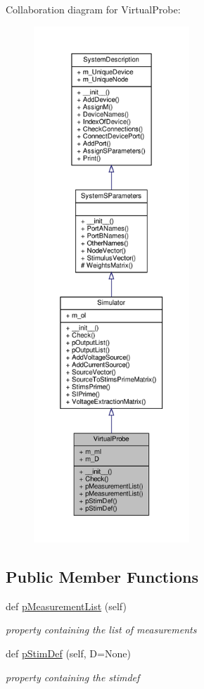 Collaboration diagram for Virtual\+Probe\+:\nopagebreak
\begin{figure}[H]
\begin{center}
\leavevmode
\includegraphics[height=550pt]{classSignalIntegrity_1_1SystemDescriptions_1_1VirtualProbe_1_1VirtualProbe__coll__graph}
\end{center}
\end{figure}
\subsection*{Public Member Functions}
\begin{DoxyCompactItemize}
\item 
def \hyperlink{classSignalIntegrity_1_1SystemDescriptions_1_1VirtualProbe_1_1VirtualProbe_af72b7ac7a9d1aa3b37f74ab894c2050d}{p\+Measurement\+List} (self)
\begin{DoxyCompactList}\small\item\em property containing the list of measurements \end{DoxyCompactList}\item 
def \hyperlink{classSignalIntegrity_1_1SystemDescriptions_1_1VirtualProbe_1_1VirtualProbe_afc6d6947dc3cd6caa0265d9ee7c4c242}{p\+Stim\+Def} (self, D=None)
\begin{DoxyCompactList}\small\item\em property containing the stimdef \end{DoxyCompactList}\end{DoxyCompactItemize}
